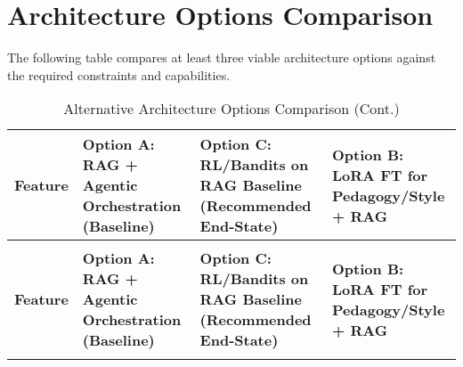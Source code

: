 \documentclass[12pt]{article}
\begin{document}
\section{Architecture Options Comparison}

The following table compares at least three viable architecture options against the required constraints and capabilities.

\begin{longtable}{p{2.5cm}p{3.5cm}p{3.5cm}p{3.5cm}}
\caption{Alternative Architecture Options Comparison} \\
\toprule
\textbf{Feature} & \textbf{Option A: RAG + Agentic Orchestration (Baseline)} & \textbf{Option C: RL/Bandits on RAG Baseline (Recommended End-State)} & \textbf{Option B: LoRA FT for Pedagogy/Style + RAG} \\
\midrule
\endfirsthead
\caption{Alternative Architecture Options Comparison (Cont.)} \\
\toprule
\textbf{Feature} & \textbf{Option A: RAG + Agentic Orchestration (Baseline)} & \textbf{Option C: RL/Bandits on RAG Baseline (Recommended End-State)} & \textbf{Option B: LoRA FT for Pedagogy/Style + RAG} \\
\midrule
\endhead
\bottomrule
\endfoot
\endlastfoot


\end{longtable}
\end{document}
